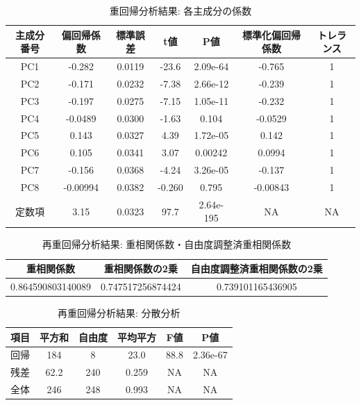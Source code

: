 \documentclass[11pt,a4paper, uplatex]{jsarticle}
\begin{document}
\begin{table}[htbp]
  \begin{center}
    \caption{重回帰分析結果: 各主成分の係数}
    \begin{tabular}{c|c|c|c|c|c|c}
      \hline
      主成分番号 & 偏回帰係数 & 標準誤差 & t値 & P値 & 標準化偏回帰係数 & トレランス \\ \hline \hline
      PC1 & -0.282 & 0.0119 & -23.6 & 2.09e-64 & -0.765 & 1 \\
      PC2 & -0.171 & 0.0232 & -7.38 & 2.66e-12 & -0.239 & 1 \\
      PC3 & -0.197 & 0.0275 & -7.15 & 1.05e-11 & -0.232 & 1 \\
      PC4 & -0.0489 & 0.0300 & -1.63 & 0.104 & -0.0529 & 1 \\
      PC5 & 0.143 & 0.0327 & 4.39 & 1.72e-05 & 0.142 & 1 \\
      PC6 & 0.105 & 0.0341 & 3.07 & 0.00242 & 0.0994 & 1 \\
      PC7 & -0.156 & 0.0368 & -4.24 & 3.26e-05 & -0.137 & 1 \\
      PC8 & -0.00994 & 0.0382 & -0.260 & 0.795 & -0.00843 & 1 \\
      定数項 & 3.15 & 0.0323 & 97.7 & 2.64e-195 & NA & NA \\
    \end{tabular}
    \label{one}
  \end{center}
\end{table}

\begin{table}[htbp]
  \begin{center}
    \caption{再重回帰分析結果: 重相関係数・自由度調整済重相関係数}
    \begin{tabular}{c|c|c}
      \hline
      重相関係数 & 重相関係数の2乗 & 自由度調整済重相関係数の2乗 \\ \hline \hline
      0.864590803140089 & 0.747517256874424 & 0.739101165436905
    \end{tabular}
    \label{Rs}
  \end{center}
\end{table}

\begin{table}[htbp]
  \begin{center}
    \caption{再重回帰分析結果: 分散分析}
    \begin{tabular}{c|c|c|c|c|c}
      \hline
      項目 & 平方和 & 自由度 & 平均平方 & F値 & P値 \\ \hline \hline
      回帰 & 184 & 8 & 23.0 & 88.8 & 2.36e-67 \\
      残差 & 62.2 & 240 & 0.259 & NA & NA \\
      全体 & 246 & 248 & 0.993 & NA & NA \\
    \end{tabular}
    \label{annova}
  \end{center}
\end{table}
\end{document}
